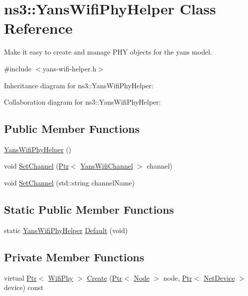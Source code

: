 \hypertarget{classns3_1_1YansWifiPhyHelper}{}\section{ns3\+:\+:Yans\+Wifi\+Phy\+Helper Class Reference}
\label{classns3_1_1YansWifiPhyHelper}


Make it easy to create and manage P\+HY objects for the yans model.  




{\ttfamily \#include $<$yans-\/wifi-\/helper.\+h$>$}



Inheritance diagram for ns3\+:\+:Yans\+Wifi\+Phy\+Helper\+:


Collaboration diagram for ns3\+:\+:Yans\+Wifi\+Phy\+Helper\+:
\subsection*{Public Member Functions}
\begin{DoxyCompactItemize}
\item 
\hyperlink{classns3_1_1YansWifiPhyHelper_a3ca9106a6f1193b8480408732c9dfe0b}{Yans\+Wifi\+Phy\+Helper} ()
\item 
void \hyperlink{classns3_1_1YansWifiPhyHelper_ad2e9a27587dd4ff320435c93cc2676de}{Set\+Channel} (\hyperlink{classns3_1_1Ptr}{Ptr}$<$ \hyperlink{classns3_1_1YansWifiChannel}{Yans\+Wifi\+Channel} $>$ channel)
\item 
void \hyperlink{classns3_1_1YansWifiPhyHelper_adb0088bcae3d5e15fa07a520e275ad46}{Set\+Channel} (std\+::string channel\+Name)
\end{DoxyCompactItemize}
\subsection*{Static Public Member Functions}
\begin{DoxyCompactItemize}
\item 
static \hyperlink{classns3_1_1YansWifiPhyHelper}{Yans\+Wifi\+Phy\+Helper} \hyperlink{classns3_1_1YansWifiPhyHelper_a75b0af43b173308e2f130605ddf34a7f}{Default} (void)
\end{DoxyCompactItemize}
\subsection*{Private Member Functions}
\begin{DoxyCompactItemize}
\item 
virtual \hyperlink{classns3_1_1Ptr}{Ptr}$<$ \hyperlink{classns3_1_1WifiPhy}{Wifi\+Phy} $>$ \hyperlink{classns3_1_1YansWifiPhyHelper_ad6145f641a60dc782ca1ae52a96c227f}{Create} (\hyperlink{classns3_1_1Ptr}{Ptr}$<$ \hyperlink{classns3_1_1Node}{Node} $>$ node, \hyperlink{classns3_1_1Ptr}{Ptr}$<$ \hyperlink{classns3_1_1NetDevice}{Net\+Device} $>$ device) const 
\end{DoxyCompactItemize}
